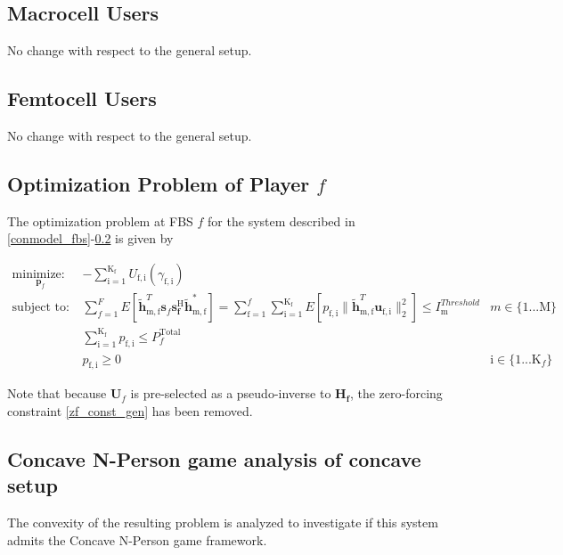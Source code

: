 \documentclass[12pt,a4paper]{report}
\begin{document}
\subsection{Macrocell Users}
No change with respect to the general setup.

\subsection{Femtocell Users}\label{conmodel_fuser}
No change with respect to the general setup.



\subsection{Optimization Problem of Player $f$}\label{conproblem}
The optimization problem at FBS $f$ for the system described in \ref{conmodel_fbs}-\ref{conmodel_fuser} is given by

	\begin{subequations}
	\label{optim}
	\begin{align}
	    \underset{\mathbf{p}_{f} }{\text{minimize: }} \;
	    & - \sum_{\mathrm{i=1}}^{\mathrm{K_f}}
    	U_{\mathrm{f,i}}(\gamma_{\mathrm{f,i}}) \label{player_opt_c} \\
	    \text{subject to: } \; &
	  \sum^F_{f=1} E\left[ \mathbf{\tilde{h}}_{\mathrm{m,f}}^T  \mathbf{s}_{f} 						
	\mathbf{s_{f}^{\mathrm{H}}} \mathbf{\tilde{h}_{\mathrm{m,f}}^*} \right]
	=
	\sum_{\mathrm{f=1}}^{f}	\sum_{\mathrm{i=1}}^{\mathrm{K_f}}
	E\left[ p_{\mathrm{f,i}}\|\tilde{\mathbf{h}}_{\mathrm{m,f}}^T \mathbf{u}_{\mathrm{f,i}}\|^2_2\right]
	\leq I^{Threshold}		
	_{\mathrm{m}} & m \in \{1 ...\text{M}\} 
		\label{interference_const_c}\\
        & 
        	\sum_{\mathrm{i=1}}^{\mathrm{K_{f}}} p_{\mathrm{f,i}}
	   \leq P_{f}^{\text{Total}}  \label{power_const_c}\\
        & p_{\mathrm{f,i}} \geq 0 &  \text{i} \in \{1 ...\text{K}_{f}\} \label{pos_power_const_c}
	\end{align}
	\end{subequations}

Note that because $\mathbf{U}_{f}$ is pre-selected as a pseudo-inverse to  $\mathbf{H_f}$, the zero-forcing constraint \eqref{zf_const_gen} has been removed.

\subsection{Concave N-Person game analysis of concave setup}
The convexity of the resulting problem is analyzed to investigate if this system admits the Concave N-Person game framework. 
\end{document}
